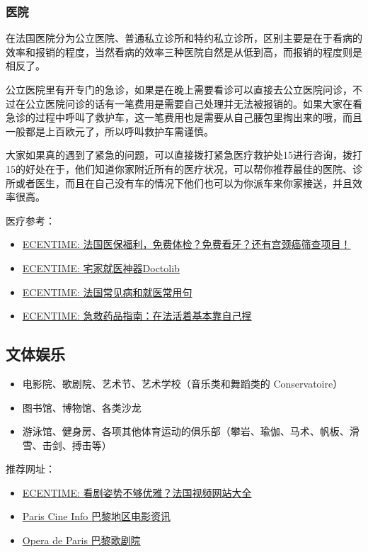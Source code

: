 \subsubsection{医院}
在法国医院分为公立医院、普通私立诊所和特约私立诊所，区别主要是在于看病的效率和报销的程度，当然看病的效率三种医院自然是从低到高，而报销的程度则是相反了。

公立医院里有开专门的急诊，如果是在晚上需要看诊可以直接去公立医院问诊，不过在公立医院问诊的话有一笔费用是需要自己处理并无法被报销的。如果大家在看急诊的过程中呼叫了救护车，这一笔费用也是需要从自己腰包里掏出来的哦，而且一般都是上百欧元了，所以呼叫救护车需谨慎。

大家如果真的遇到了紧急的问题，可以直接拨打紧急医疗救护处15进行咨询，拨打15的好处在于，他们知道你家附近所有的医疗状况，可以帮你推荐最佳的医院、诊所或者医生，而且在自己没有车的情况下他们也可以为你派车来你家接送，并且效率很高。

医疗参考：
\begin{itemize}
    \item \href{https://www.ecentime.com/article/ecentime-ameli-gratuit}{ECENTIME: 法国医保福利，免费体检？免费看牙？还有宫颈癌筛查项目！}
    \item \href{https://www.ecentime.com/article/comment-utiliser-doctolib-pendant-le-confinement}{ECENTIME: 宅家就医神器Doctolib}
    \item \href{https://www.dealmoon.fr/guide/1366}{ECENTIME: 法国常见病和就医常用句}
    \item \href{https://www.ecentime.com/article/2018-pharmacie-list}{ECENTIME: 急救药品指南：在法活着基本靠自己撑}
\end{itemize}

\subsection{文体娱乐}
\begin{itemize}
    \item 电影院、歌剧院、艺术节、艺术学校（音乐类和舞蹈类的 Conservatoire）
    \item 图书馆、博物馆、各类沙龙
    \item 游泳馆、健身房、各项其他体育运动的俱乐部（攀岩、瑜伽、马术、帆板、滑雪、击剑、搏击等）
\end{itemize}

推荐网址：
\begin{itemize}
    \item \href{https://www.ecentime.com/article/streaming-website }{ECENTIME: 看剧姿势不够优雅？法国视频网站大全}
    \item \href{https://paris-cine.info/}{Paris Cine Info 巴黎地区电影资讯}
    \item \href{https://www.operadeparis.fr/en}{Opera de Paris 巴黎歌剧院}
\end{itemize}

